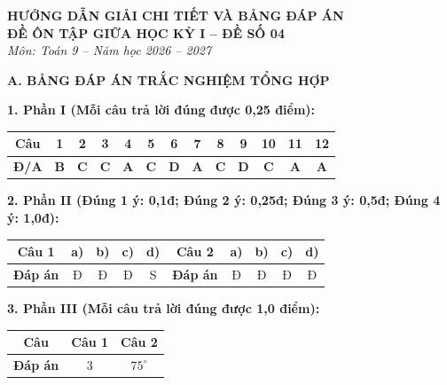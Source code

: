 \documentclass[12pt,a4paper]{article}
\begin{document}
\begin{center}
  \textbf{\Large HƯỚNG DẪN GIẢI CHI TIẾT VÀ BẢNG ĐÁP ÁN}\\
  \textbf{\large ĐỀ ÔN TẬP GIỮA HỌC KỲ I -- ĐỀ SỐ 04}\\
  \textit{Môn: Toán 9 -- Năm học 2026 -- 2027}
\end{center}
\vspace{2mm}

\noindent\textbf{\large A. BẢNG ĐÁP ÁN TRẮC NGHIỆM TỔNG HỢP}
\vspace{1mm}

\noindent\textbf{1. Phần I (Mỗi câu trả lời đúng được 0,25 điểm):}
\begin{center}
\begin{tabular}{|c|c|c|c|c|c|c|c|c|c|c|c|c|}
\hline
\textbf{Câu} & \textbf{1} & \textbf{2} & \textbf{3} & \textbf{4} & \textbf{5} & \textbf{6} & \textbf{7} & \textbf{8} & \textbf{9} & \textbf{10} & \textbf{11} & \textbf{12} \\
\hline
\textbf{Đ/A} & \textbf{B} & \textbf{C} & \textbf{C} & \textbf{A} & \textbf{C} & \textbf{D} & \textbf{A} & \textbf{C} & \textbf{D} & \textbf{C} & \textbf{A} & \textbf{A} \\
\hline
\end{tabular}
\end{center}
\vspace{0.5mm}

\noindent\textbf{2. Phần II (Đúng 1 ý: 0,1đ; Đúng 2 ý: 0,25đ; Đúng 3 ý: 0,5đ; Đúng 4 ý: 1,0đ):}
\begin{center}
\begin{tabular}{|c|c|c|c|c||c|c|c|c|c|}
\hline
\textbf{Câu 1} & \textbf{a)} & \textbf{b)} & \textbf{c)} & \textbf{d)} & \textbf{Câu 2} & \textbf{a)} & \textbf{b)} & \textbf{c)} & \textbf{d)} \\
\hline
\textbf{Đáp án} & Đ & Đ & Đ & S & \textbf{Đáp án} & Đ & Đ & Đ & Đ \\
\hline
\end{tabular}
\end{center}
\vspace{0.5mm}

\noindent\textbf{3. Phần III (Mỗi câu trả lời đúng được 1,0 điểm):}
\begin{center}
\begin{tabular}{|c|c|c|}
\hline
\textbf{Câu} & \textbf{Câu 1} & \textbf{Câu 2} \\
\hline
\textbf{Đáp án} & $3$ & $75^\circ$ \\
\hline
\end{tabular}
\end{center}
\vspace{2mm}
\end{document}
